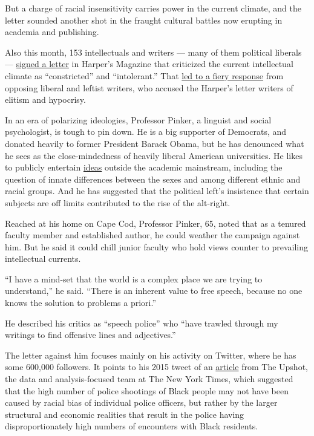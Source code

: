 But a charge of racial insensitivity carries power in the current
climate, and the letter sounded another shot in the fraught cultural
battles now erupting in academia and publishing.

Also this month, 153 intellectuals and writers --- many of them
political liberals ---
\href{https://www.nytimes.com/2020/07/07/arts/harpers-letter.html}{signed
a letter} in Harper's Magazine that criticized the current intellectual
climate as ``constricted'' and ``intolerant.'' That
\href{https://www.nytimes.com/2020/07/10/arts/open-letter-debate.html}{led
to a fiery response} from opposing liberal and leftist writers, who
accused the Harper's letter writers of elitism and hypocrisy.

In an era of polarizing ideologies, Professor Pinker, a linguist and
social psychologist, is tough to pin down. He is a big supporter of
Democrats, and donated heavily to former President Barack Obama, but he
has denounced what he sees as the close-mindedness of heavily liberal
American universities. He likes to publicly entertain
\href{https://newrepublic.com/article/77727/groups-and-genes}{ideas}
outside the academic mainstream, including the question of innate
differences between the sexes and among different ethnic and racial
groups. And he has suggested that the political left's insistence that
certain subjects are off limits contributed to the rise of the
alt-right.

Reached at his home on Cape Cod, Professor Pinker, 65, noted that as a
tenured faculty member and established author, he could weather the
campaign against him. But he said it could chill junior faculty who hold
views counter to prevailing intellectual currents.

``I have a mind-set that the world is a complex place we are trying to
understand,'' he said. ``There is an inherent value to free speech,
because no one knows the solution to problems a priori.''

He described his critics as ``speech police'' who ``have trawled through
my writings to find offensive lines and adjectives.''

The letter against him focuses mainly on his activity on Twitter, where
he has some 600,000 followers. It points to his 2015 tweet of an
\href{https://www.nytimes.com/2015/10/18/upshot/police-killings-of-blacks-what-the-data-says.html?smid=tw-share}{article}
from The Upshot, the data and analysis-focused team at The New York
Times, which suggested that the high number of police shootings of Black
people may not have been caused by racial bias of individual police
officers, but rather by the larger structural and economic realities
that result in the police having disproportionately high numbers of
encounters with Black residents.

